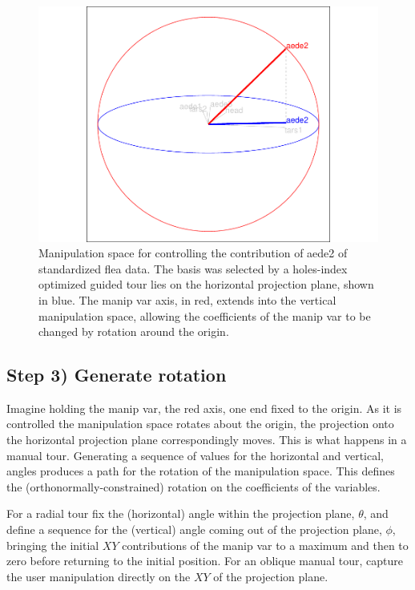 \begin{Schunk}
\begin{figure}

{\centering \includegraphics[width=0.7\linewidth]{spinifex_paper_files/figure-latex/step2-1} 

}

\caption[Manipulation space for controlling the contribution of aede2 of standardized flea data]{Manipulation space for controlling the contribution of aede2 of standardized flea data. The basis was selected by a holes-index optimized guided tour lies on the horizontal projection plane, shown in blue. The manip var axis, in red, extends into the vertical manipulation space, allowing the coefficients of the manip var to be changed by rotation around the origin.}\label{fig:step2}
\end{figure}
\end{Schunk}

\hypertarget{step-3-generate-rotation}{%
\subsection{Step 3) Generate rotation}\label{step-3-generate-rotation}}

Imagine holding the manip var, the red axis, one end fixed to the
origin. As it is controlled the manipulation space rotates about the
origin, the projection onto the horizontal projection plane
correspondingly moves. This is what happens in a manual tour. Generating
a sequence of values for the horizontal and vertical, angles produces a
path for the rotation of the manipulation space. This defines the
(orthonormally-constrained) rotation on the coefficients of the
variables.

For a radial tour fix the (horizontal) angle within the projection
plane, \(\theta\), and define a sequence for the (vertical) angle coming
out of the projection plane, \(\phi\), bringing the initial \(XY\)
contributions of the manip var to a maximum and then to zero before
returning to the initial position. For an oblique manual tour, capture
the user manipulation directly on the \(XY\) of the projection plane.

